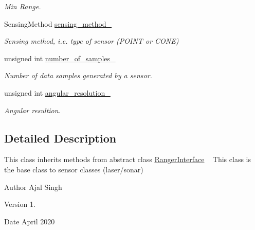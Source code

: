 \begin{DoxyCompactItemize}
\begin{DoxyCompactList}\small\item\em Min Range. \end{DoxyCompactList}\item 
Sensing\+Method \hyperlink{classRanger_a2d81156691f120f123ea3ab6e3028ef1}{sensing\+\_\+method\+\_\+}\hypertarget{classRanger_a2d81156691f120f123ea3ab6e3028ef1}{}\label{classRanger_a2d81156691f120f123ea3ab6e3028ef1}

\begin{DoxyCompactList}\small\item\em Sensing method, i.\+e. type of sensor (P\+O\+I\+NT or C\+O\+NE) \end{DoxyCompactList}\item 
unsigned int \hyperlink{classRanger_af3ee97c4a20ab9a831ea7c87eb85a5b0}{number\+\_\+of\+\_\+samples\+\_\+}\hypertarget{classRanger_af3ee97c4a20ab9a831ea7c87eb85a5b0}{}\label{classRanger_af3ee97c4a20ab9a831ea7c87eb85a5b0}

\begin{DoxyCompactList}\small\item\em Number of data samples generated by a sensor. \end{DoxyCompactList}\item 
unsigned int \hyperlink{classRanger_a0f8dec4bca07df9c2154c7746fd25e77}{angular\+\_\+resolution\+\_\+}\hypertarget{classRanger_a0f8dec4bca07df9c2154c7746fd25e77}{}\label{classRanger_a0f8dec4bca07df9c2154c7746fd25e77}

\begin{DoxyCompactList}\small\item\em Angular resultion. \end{DoxyCompactList}\end{DoxyCompactItemize}


\subsection{Detailed Description}
This class inherits methods from abstract class \hyperlink{classRangerInterface}{Ranger\+Interface} ~\newline
 This class is the base class to sensor classes (laser/sonar) 

\begin{DoxyAuthor}{Author}
Ajal Singh 
\end{DoxyAuthor}
\begin{DoxyVersion}{Version}
1. 
\end{DoxyVersion}
\begin{DoxyDate}{Date}
April 2020 
\end{DoxyDate}


